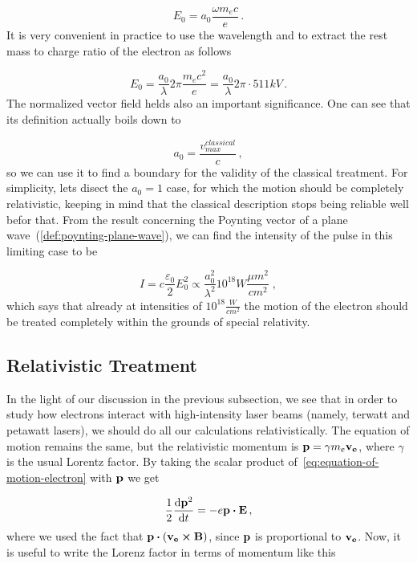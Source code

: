 \documentclass[12pt, class=report, crop=false]{standalone}
\begin{document}
\begin{equation}
  E_0 = a_0 \frac{\omega m_e c}{e}\,.
\end{equation}
It is very convenient in practice to use the wavelength and to extract the rest mass to charge ratio of the electron as follows

\begin{equation}
  E_0 = \frac{a_0}{\lambda} 2\pi \frac{m_e c^2}{e} = \frac{a_0}{\lambda} 2\pi\cdot 511 kV\,.
\end{equation}
The normalized vector field helds also an important significance. One can see that its definition actually boils down to

\begin{equation}
  a_0 = \frac{v_{max}^{classical}}{c}\,,
\end{equation}
so we can use it to find a boundary for the validity of the classical treatment. For simplicity, lets disect the \(a_0 = 1\) case, for which the motion should be completely relativistic, keeping in mind that the classical description stops being reliable well befor that. From the result concerning the Poynting vector of a plane wave~(\ref{def:poynting-plane-wave}), we can find the intensity of the pulse in this limiting case to be

\begin{equation}
  I = c \frac{\varepsilon_0}{2} E_0^2 \propto \frac{a_0^2}{\lambda^2} 10^{18} W \frac{\mu m^2}{cm^2}\;,
\end{equation}
which says that already at intensities of \(10^{18} \frac{W}{cm^2}\) the motion of the electron should be treated completely within the grounds of special relativity.

\subsection{Relativistic Treatment}
In the light of our discussion in the previous subsection, we see that in order to study how electrons interact with high-intensity laser beams (namely, terwatt and petawatt lasers), we should do all our calculations relativistically. The equation of motion remains the same, but the relativistic momentum is \(\vb{p} = \gamma m_e \vb{v_e}\), where \(\gamma\) is the usual Lorentz factor. By taking the scalar product of~\cref{eq:equation-of-motion-electron} with \(\vb{p}\) we get

\begin{equation}
  \frac{1}{2} \dv{\vb{p}^2}{t} = - e \vb{p}\vdot\vb{E}\,,
\end{equation}
where we used the fact that \(\vb{p}\vdot\left(\vb{v_e}\cp\vb{B}\right)\), since \(\vb{p}\) is proportional to \(\vb{v_e}\). Now, it is useful to write the Lorenz factor in terms of momentum like this
\end{document}
